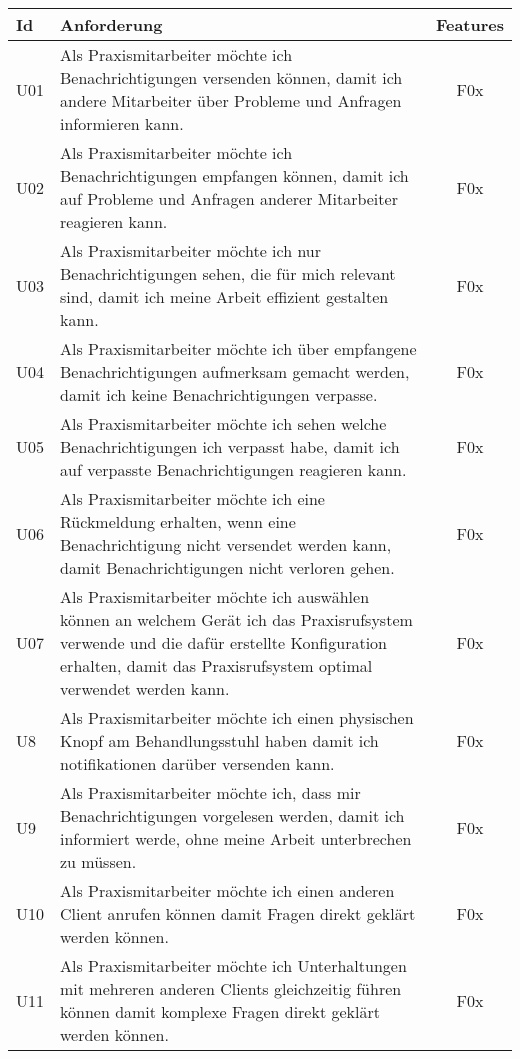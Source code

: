 \begin{table}[h]
    \centering
    \begin{tabular}{|l|p{13cm}|c|}
        \hline
        \textbf{Id} & \textbf{Anforderung}                                                                                                                                      & \textbf{Features} \\
        \hline
        U01         & Als Praxismitarbeiter möchte ich Benachrichtigungen versenden können, damit ich andere Mitarbeiter über Probleme und Anfragen informieren kann. & F0x \\
        \hline
        U02         & Als Praxismitarbeiter möchte ich Benachrichtigungen empfangen können, damit ich auf Probleme und Anfragen anderer Mitarbeiter reagieren kann. & F0x \\
        \hline
        U03         & Als Praxismitarbeiter möchte ich nur Benachrichtigungen sehen, die für mich relevant sind, damit ich meine Arbeit effizient gestalten kann. & F0x \\
        \hline
        U04         & Als Praxismitarbeiter möchte ich über empfangene Benachrichtigungen aufmerksam gemacht werden, damit ich keine Benachrichtigungen verpasse. & F0x \\
        \hline
        U05         & Als Praxismitarbeiter möchte ich sehen welche Benachrichtigungen ich verpasst habe, damit ich auf verpasste Benachrichtigungen reagieren kann. & F0x \\
        \hline
        U06         & Als Praxismitarbeiter möchte ich eine Rückmeldung erhalten, wenn eine Benachrichtigung nicht versendet werden kann, damit Benachrichtigungen nicht verloren gehen. & F0x \\
        \hline
        U07         & Als Praxismitarbeiter möchte ich auswählen können an welchem Gerät ich das Praxisrufsystem verwende und die dafür erstellte Konfiguration erhalten, damit das Praxisrufsystem optimal verwendet werden kann. & F0x \\
        \hline
        U8          & Als Praxismitarbeiter möchte ich einen physischen Knopf am Behandlungsstuhl haben damit ich notifikationen darüber versenden kann. & F0x \\
        \hline
        U9          & Als Praxismitarbeiter möchte ich, dass mir Benachrichtigungen vorgelesen werden, damit ich informiert werde, ohne meine Arbeit unterbrechen zu müssen. & F0x \\
        \hline
        U10          & Als Praxismitarbeiter möchte ich einen anderen Client anrufen können damit Fragen direkt geklärt werden können. & F0x \\
        \hline
        U11         & Als Praxismitarbeiter möchte ich Unterhaltungen mit mehreren anderen Clients gleichzeitig führen können damit komplexe Fragen direkt geklärt werden können. & F0x \\
        \hline
    \end{tabular}\label{tab:userstories1}
\end{table}

